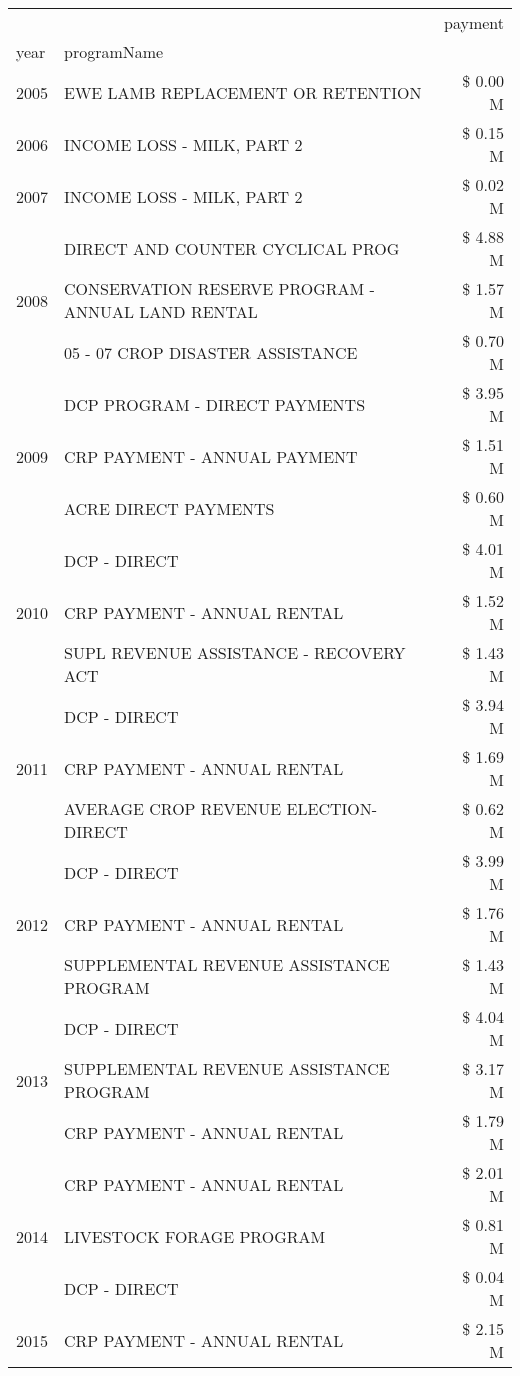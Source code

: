 \begin{tabular}{llr}
\toprule
 &  & payment \\
year & programName &  \\
\midrule
2005 & EWE LAMB REPLACEMENT OR RETENTION & \$ 0.00 M \\
\cline{1-3}
2006 & INCOME LOSS - MILK, PART 2 & \$ 0.15 M \\
\cline{1-3}
2007 & INCOME LOSS - MILK, PART 2 & \$ 0.02 M \\
\cline{1-3}
\multirow[t]{3}{*}{2008} & DIRECT AND COUNTER CYCLICAL PROG & \$ 4.88 M \\
 & CONSERVATION RESERVE PROGRAM - ANNUAL LAND RENTAL & \$ 1.57 M \\
 & 05 - 07 CROP DISASTER ASSISTANCE & \$ 0.70 M \\
\cline{1-3}
\multirow[t]{3}{*}{2009} & DCP PROGRAM - DIRECT PAYMENTS & \$ 3.95 M \\
 & CRP PAYMENT - ANNUAL PAYMENT & \$ 1.51 M \\
 & ACRE DIRECT PAYMENTS & \$ 0.60 M \\
\cline{1-3}
\multirow[t]{3}{*}{2010} & DCP - DIRECT & \$ 4.01 M \\
 & CRP PAYMENT - ANNUAL RENTAL & \$ 1.52 M \\
 & SUPL REVENUE ASSISTANCE - RECOVERY ACT & \$ 1.43 M \\
\cline{1-3}
\multirow[t]{3}{*}{2011} & DCP - DIRECT & \$ 3.94 M \\
 & CRP PAYMENT - ANNUAL RENTAL & \$ 1.69 M \\
 & AVERAGE CROP REVENUE ELECTION-DIRECT & \$ 0.62 M \\
\cline{1-3}
\multirow[t]{3}{*}{2012} & DCP - DIRECT & \$ 3.99 M \\
 & CRP PAYMENT - ANNUAL RENTAL & \$ 1.76 M \\
 & SUPPLEMENTAL REVENUE ASSISTANCE PROGRAM & \$ 1.43 M \\
\cline{1-3}
\multirow[t]{3}{*}{2013} & DCP - DIRECT & \$ 4.04 M \\
 & SUPPLEMENTAL REVENUE ASSISTANCE PROGRAM & \$ 3.17 M \\
 & CRP PAYMENT - ANNUAL RENTAL & \$ 1.79 M \\
\cline{1-3}
\multirow[t]{3}{*}{2014} & CRP PAYMENT - ANNUAL RENTAL & \$ 2.01 M \\
 & LIVESTOCK FORAGE PROGRAM & \$ 0.81 M \\
 & DCP - DIRECT & \$ 0.04 M \\
\cline{1-3}
\multirow[t]{3}{*}{2015} & CRP PAYMENT - ANNUAL RENTAL & \$ 2.15 M \\

\end{tabular}
